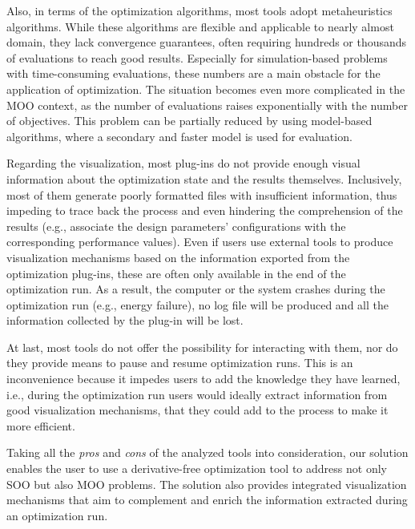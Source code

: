 
Also, in terms of the optimization algorithms, most tools adopt metaheuristics algorithms. While these algorithms are flexible and applicable to nearly almost domain, they lack convergence guarantees, often requiring hundreds or thousands of evaluations to reach good results. Especially for simulation-based problems with time-consuming evaluations, these numbers are a main obstacle for the application of optimization. The situation becomes even more complicated  in the \ac{MOO} context, as the number of evaluations raises exponentially with the number of objectives. This problem can be partially reduced by using model-based algorithms, where a secondary and faster model is used for evaluation.

Regarding the visualization, most plug-ins do not provide enough visual information about the optimization state and the results themselves. Inclusively, most of them generate poorly formatted files with insufficient information, thus impeding to trace back the process and even hindering the comprehension of the results (e.g., associate the design parameters' configurations with the corresponding performance values). Even if users use external tools to produce visualization mechanisms based on the information exported from the optimization plug-ins, these are often only available in the end of the optimization run. As a result, the computer or the system crashes during the optimization run (e.g., energy failure), no log file will be produced and all the information collected by the plug-in will be lost. 

At last, most tools do not offer the possibility for interacting with them, nor do they provide means to pause and resume optimization runs. This is an inconvenience because it impedes users to add the knowledge they have learned, i.e., during the optimization run users would ideally extract information from good visualization mechanisms, that they could add to the process to make it more efficient.

Taking all the \textit{pros} and \textit{cons} of the analyzed tools into consideration, our solution enables the user to use a derivative-free optimization tool to address not only \ac{SOO} but also \ac{MOO} problems. The solution also provides integrated visualization mechanisms that aim to complement and enrich the information extracted during an optimization run. 

